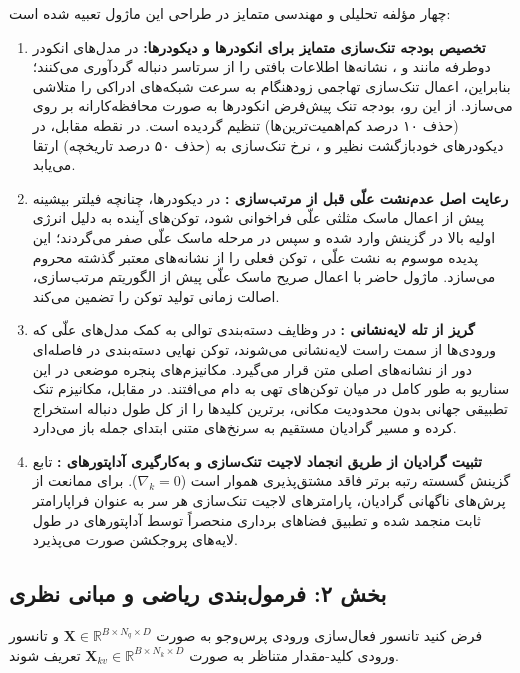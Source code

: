 چهار مؤلفه تحلیلی و مهندسی متمایز در طراحی این ماژول تعبیه شده است:
\begin{enumerate}
    \item \textbf{تخصیص بودجه تنک‌سازی متمایز برای انکودرها و دیکودرها:} در مدل‌های انکودر دوطرفه  مانند  و ، نشانه‌ها اطلاعات بافتی را از سرتاسر دنباله گردآوری می‌کنند؛ بنابراین، اعمال تنک‌سازی تهاجمی زودهنگام به سرعت شبکه‌های ادراکی را متلاشی می‌سازد. از این رو، بودجه تنک پیش‌فرض انکودرها به صورت محافظه‌کارانه بر روی  (حذف ۱۰ درصد کم‌اهمیت‌ترین‌ها) تنظیم گردیده است. در نقطه مقابل، در دیکودرهای خودبازگشت  نظیر  و ، نرخ تنک‌سازی به  (حذف ۵۰ درصد تاریخچه) ارتقا می‌یابد.
    \item \textbf{رعایت اصل عدم‌نشت علّی قبل از مرتب‌سازی :} در دیکودرها، چنانچه فیلتر بیشینه  پیش از اعمال ماسک مثلثی علّی  فراخوانی شود، توکن‌های آینده به دلیل انرژی اولیه بالا در گزینش وارد شده و سپس در مرحله ماسک علّی صفر می‌گردند؛ این پدیده موسوم به نشت علّی ، توکن فعلی را از نشانه‌های معتبر گذشته محروم می‌سازد. ماژول حاضر با اعمال صریح ماسک علّی پیش از الگوریتم مرتب‌سازی، اصالت زمانی تولید توکن را تضمین می‌کند.
    \item \textbf{گریز از تله لایه‌نشانی :} در وظایف دسته‌بندی توالی به کمک مدل‌های علّی که ورودی‌ها از سمت راست لایه‌نشانی  می‌شوند، توکن نهایی دسته‌بندی در فاصله‌ای دور از نشانه‌های اصلی متن قرار می‌گیرد. مکانیزم‌های پنجره موضعی در این سناریو به طور کامل در میان توکن‌های تهی به دام می‌افتند. در مقابل، مکانیزم تنک تطبیقی جهانی  بدون محدودیت مکانی، برترین کلیدها را از کل طول دنباله استخراج کرده و مسیر گرادیان مستقیم به سرنخ‌های متنی ابتدای جمله باز می‌دارد.
    \item \textbf{تثبیت گرادیان از طریق انجماد لاجیت تنک‌سازی و به‌کارگیری آداپتورهای :} تابع گزینش گسسته رتبه برتر فاقد مشتق‌پذیری هموار است ($\nabla_k = 0$). برای ممانعت از پرش‌های ناگهانی گرادیان، پارامترهای لاجیت تنک‌سازی هر سر  به عنوان فراپارامتر ثابت منجمد شده  و تطبیق فضاهای برداری منحصراً توسط آداپتورهای  در طول لایه‌های پروجکشن صورت می‌پذیرد.
\end{enumerate}

\subsection*{بخش ۲: فرمول‌بندی ریاضی و مبانی نظری }
فرض کنید تانسور فعال‌سازی ورودی پرس‌وجو به صورت $\mathbf{X} \in \mathbb{R}^{B \times N_q \times D}$ و تانسور ورودی کلید-مقدار متناظر به صورت $\mathbf{X}_{kv} \in \mathbb{R}^{B \times N_k \times D}$ تعریف شوند.


